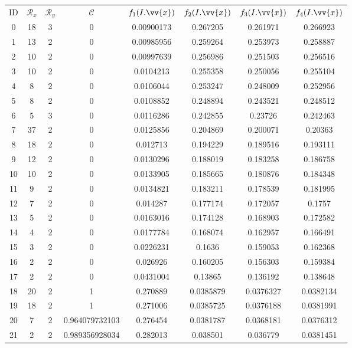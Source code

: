 \scriptsize
\begin{longtable}{|c|c|c|c|c|c|c|c|}
\hline
ID & $\mathscr{R}_x$ & $\mathscr{R}_y$ & $\mathscr{C}$ & $f_1(I.\vv{x})$ & $f_2(I.\vv{x})$ & $f_3(I.\vv{x})$ & $f_4(I.\vv{x})$ \\
0 & 18 & 3 & 0 & 0.00900173 & 0.267205 & 0.261971 & 0.266923 \\
1 & 13 & 2 & 0 & 0.00985956 & 0.259264 & 0.253973 & 0.258887 \\
2 & 10 & 2 & 0 & 0.00997639 & 0.256986 & 0.251503 & 0.256516 \\
3 & 10 & 2 & 0 & 0.0104213 & 0.255358 & 0.250056 & 0.255104 \\
4 & 8 & 2 & 0 & 0.0106044 & 0.253247 & 0.248009 & 0.252956 \\
5 & 8 & 2 & 0 & 0.0108852 & 0.248894 & 0.243521 & 0.248512 \\
6 & 5 & 3 & 0 & 0.0116286 & 0.242855 & 0.23726 & 0.242463 \\
7 & 37 & 2 & 0 & 0.0125856 & 0.204869 & 0.200071 & 0.20363 \\
8 & 18 & 2 & 0 & 0.012713 & 0.194229 & 0.189516 & 0.193111 \\
9 & 12 & 2 & 0 & 0.0130296 & 0.188019 & 0.183258 & 0.186758 \\
10 & 10 & 2 & 0 & 0.0133905 & 0.185665 & 0.180876 & 0.184348 \\
11 & 9 & 2 & 0 & 0.0134821 & 0.183211 & 0.178539 & 0.181995 \\
12 & 7 & 2 & 0 & 0.014287 & 0.177174 & 0.172057 & 0.1757 \\
13 & 5 & 2 & 0 & 0.0163016 & 0.174128 & 0.168903 & 0.172582 \\
14 & 4 & 2 & 0 & 0.0177784 & 0.168074 & 0.162957 & 0.166491 \\
15 & 3 & 2 & 0 & 0.0226231 & 0.1636 & 0.159053 & 0.162368 \\
16 & 2 & 2 & 0 & 0.026926 & 0.160205 & 0.156303 & 0.159384 \\
17 & 2 & 2 & 0 & 0.0431004 & 0.13865 & 0.136192 & 0.138648 \\
18 & 20 & 2 & 1 & 0.270889 & 0.0385879 & 0.0376327 & 0.0382134 \\
19 & 18 & 2 & 1 & 0.271006 & 0.0385725 & 0.0376188 & 0.0381991 \\
20 & 7 & 2 & 0.964079732103 & 0.276454 & 0.0381787 & 0.0368181 & 0.0376312 \\
21 & 2 & 2 & 0.989356928034 & 0.282013 & 0.038501 & 0.036779 & 0.0381451 \\

\end{longtable}
